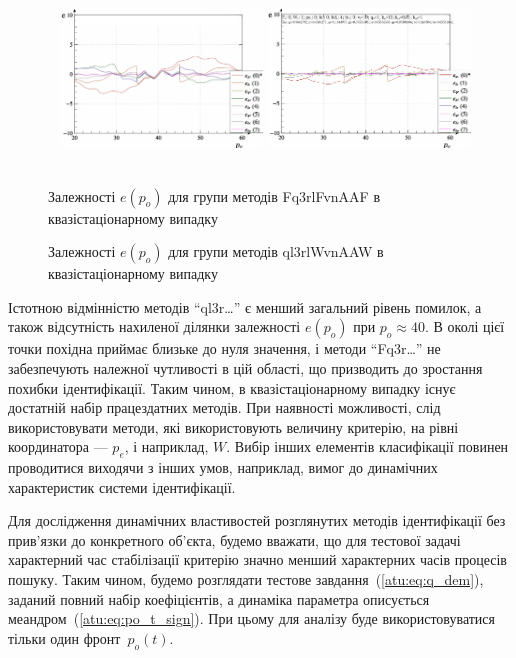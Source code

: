 \documentclass[a4paper,13pt]{atuaref}
\begin{document}
\begin{figure}[htb!]
   \begin{center}
     ~ \hfill
    \includegraphics[width=0.48\textwidth]{p3/p/scan/qls-p_p_e_Fq3rlFvnAAF_scan_xl.png}
     \hfill
    \includegraphics[width=0.48\textwidth]{p3/p/scan/qls-p_p_e_ql3rlWvnAAW_scan_xl.png}
     \hfill ~
   \end{center}
  \parbox[t]{0.48\textwidth} {
    \caption{Залежності $e (p_o)$ для групи методів Fq3rlFvnAAF в квазістаціонарному випадку}
    \label{atu:f:Fq3rlFvnAAF_scan}
  } \hfill
  \parbox[t]{0.48\textwidth} {
    \caption{Залежності $e (p_o)$ для групи методів ql3rlWvnAAW в квазістаціонарному випадку}
    \label{atu:f:ql3rlWvnAAW_scan}
  }
\end{figure}

Істотною відмінністю методів ``ql3r\ldots'' є менший загальний рівень
помилок, а також відсутність нахиленої ділянки залежності $e (p_o)$ при
$p_o \approx 40$. В околі цієї точки похідна приймає близьке до нуля значення, і
методи ``Fq3r\ldots'' не забезпечують належної чутливості в цій області, що
призводить до зростання похибки ідентифікації.
Таким чином, в квазістаціонарному випадку існує достатній набір працездатних
методів. При наявності можливості, слід використовувати методи, які
використовують величину критерію, на рівні координатора --- $p_e$, і
наприклад, $W$. Вибір інших елементів класифікації повинен проводитися
виходячи з інших умов, наприклад, вимог до динамічних характеристик системи
ідентифікації.

Для дослідження динамічних властивостей розглянутих методів ідентифікації без
прив'язки до конкретного об'єкта, будемо вважати, що для тестової задачі
характерний час стабілізації критерію значно менший характерних часів процесів
пошуку.
Таким чином, будемо розглядати тестове завдання~(\ref{atu:eq:q_dem}),
заданий повний набір коефіцієнтів, а динаміка параметра описується меандром~(\ref{atu:eq:po_t_sign}).
При цьому для аналізу буде використовуватися тільки один фронт~$p_o(t)$.
\end{document}
